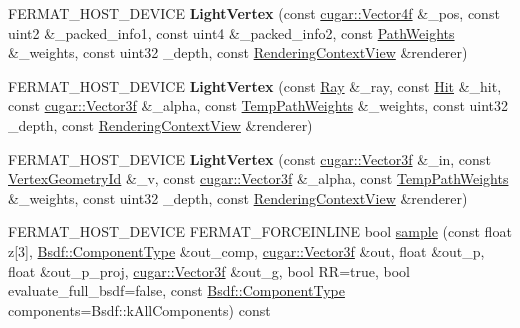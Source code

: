 \begin{DoxyCompactItemize}
\item 
\mbox{\label{struct_light_vertex_a3fc35df12e7a88367b66c7b7020914a0}} 
F\+E\+R\+M\+A\+T\+\_\+\+H\+O\+S\+T\+\_\+\+D\+E\+V\+I\+CE {\bfseries Light\+Vertex} (const \hyperlink{structcugar_1_1_vector}{cugar\+::\+Vector4f} \&\+\_\+pos, const uint2 \&\+\_\+packed\+\_\+info1, const uint4 \&\+\_\+packed\+\_\+info2, const \hyperlink{struct_path_weights}{Path\+Weights} \&\+\_\+weights, const uint32 \+\_\+depth, const \hyperlink{struct_rendering_context_view}{Rendering\+Context\+View} \&renderer)
\item 
\mbox{\label{struct_light_vertex_a0cf76cff35be4e3d76d52c9d0b3b1d00}} 
F\+E\+R\+M\+A\+T\+\_\+\+H\+O\+S\+T\+\_\+\+D\+E\+V\+I\+CE {\bfseries Light\+Vertex} (const \hyperlink{struct_ray}{Ray} \&\+\_\+ray, const \hyperlink{struct_hit}{Hit} \&\+\_\+hit, const \hyperlink{structcugar_1_1_vector}{cugar\+::\+Vector3f} \&\+\_\+alpha, const \hyperlink{struct_temp_path_weights}{Temp\+Path\+Weights} \&\+\_\+weights, const uint32 \+\_\+depth, const \hyperlink{struct_rendering_context_view}{Rendering\+Context\+View} \&renderer)
\item 
\mbox{\label{struct_light_vertex_a2390fe15e94a34cd60db50e6b6cae0d1}} 
F\+E\+R\+M\+A\+T\+\_\+\+H\+O\+S\+T\+\_\+\+D\+E\+V\+I\+CE {\bfseries Light\+Vertex} (const \hyperlink{structcugar_1_1_vector}{cugar\+::\+Vector3f} \&\+\_\+in, const \hyperlink{struct_vertex_geometry_id}{Vertex\+Geometry\+Id} \&\+\_\+v, const \hyperlink{structcugar_1_1_vector}{cugar\+::\+Vector3f} \&\+\_\+alpha, const \hyperlink{struct_temp_path_weights}{Temp\+Path\+Weights} \&\+\_\+weights, const uint32 \+\_\+depth, const \hyperlink{struct_rendering_context_view}{Rendering\+Context\+View} \&renderer)
\item 
F\+E\+R\+M\+A\+T\+\_\+\+H\+O\+S\+T\+\_\+\+D\+E\+V\+I\+CE F\+E\+R\+M\+A\+T\+\_\+\+F\+O\+R\+C\+E\+I\+N\+L\+I\+NE bool \hyperlink{struct_light_vertex_a2e6fa24feb3e233f487b6a33ea5ed622}{sample} (const float z\mbox{[}3\mbox{]}, \hyperlink{struct_bsdf_a5f7db6f81220ed9ee6da109d6eb5b585}{Bsdf\+::\+Component\+Type} \&out\+\_\+comp, \hyperlink{structcugar_1_1_vector}{cugar\+::\+Vector3f} \&out, float \&out\+\_\+p, float \&out\+\_\+p\+\_\+proj, \hyperlink{structcugar_1_1_vector}{cugar\+::\+Vector3f} \&out\+\_\+g, bool RR=true, bool evaluate\+\_\+full\+\_\+bsdf=false, const \hyperlink{struct_bsdf_a5f7db6f81220ed9ee6da109d6eb5b585}{Bsdf\+::\+Component\+Type} components=Bsdf\+::k\+All\+Components) const
\end{DoxyCompactItemize}
